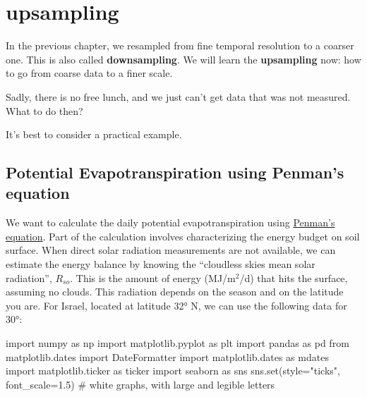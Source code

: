 \documentclass[
  letterpaper,
  DIV=11,
  numbers=noendperiod,
  oneside]{scrreprt}
\newenvironment{Shaded}{\begin{snugshade}}{\end{snugshade}}
\newcommand{\BuiltInTok}[1]{\textcolor[rgb]{0.00,0.23,0.31}{#1}}
\newcommand{\CommentTok}[1]{\textcolor[rgb]{0.37,0.37,0.37}{#1}}
\newcommand{\FloatTok}[1]{\textcolor[rgb]{0.68,0.00,0.00}{#1}}
\newcommand{\ImportTok}[1]{\textcolor[rgb]{0.00,0.46,0.62}{#1}}
\newcommand{\NormalTok}[1]{\textcolor[rgb]{0.00,0.23,0.31}{#1}}
\newcommand{\OperatorTok}[1]{\textcolor[rgb]{0.37,0.37,0.37}{#1}}
\newcommand{\StringTok}[1]{\textcolor[rgb]{0.13,0.47,0.30}{#1}}
\begin{document}
\hypertarget{upsampling}{%
\chapter{upsampling}\label{upsampling}}

In the previous chapter, we resampled from fine temporal resolution to a
coarser one. This is also called \textbf{downsampling}. We will learn
the \textbf{upsampling} now: how to go from coarse data to a finer
scale.

Sadly, there is no free lunch, and we just can't get data that was not
measured. What to do then?

It's best to consider a practical example.

\hypertarget{potential-evapotranspiration-using-penmans-equation}{%
\section{Potential Evapotranspiration using Penman's
equation}\label{potential-evapotranspiration-using-penmans-equation}}

We want to calculate the daily potential evapotranspiration using
\href{http://yairmau.com/surface-hydrology/evapotranspiration/evapotranspiration-lecture.html\#net-radiation}{Penman's
equation}. Part of the calculation involves characterizing the energy
budget on soil surface. When direct solar radiation measurements are not
available, we can estimate the energy balance by knowing the ``cloudless
skies mean solar radiation'', \(R_{so}\). This is the amount of energy
(MJ/m\(^2\)/d) that hits the surface, assuming no clouds. This radiation
depends on the season and on the latitude you are. For Israel, located
at latitude 32° N, we can use the following data for 30°:

\begin{Shaded}
\begin{Highlighting}[]
\ImportTok{import}\NormalTok{ numpy }\ImportTok{as}\NormalTok{ np}
\ImportTok{import}\NormalTok{ matplotlib.pyplot }\ImportTok{as}\NormalTok{ plt}
\ImportTok{import}\NormalTok{ pandas }\ImportTok{as}\NormalTok{ pd}
\ImportTok{from}\NormalTok{ matplotlib.dates }\ImportTok{import}\NormalTok{ DateFormatter}
\ImportTok{import}\NormalTok{ matplotlib.dates }\ImportTok{as}\NormalTok{ mdates}
\ImportTok{import}\NormalTok{ matplotlib.ticker }\ImportTok{as}\NormalTok{ ticker}
\ImportTok{import}\NormalTok{ seaborn }\ImportTok{as}\NormalTok{ sns}
\NormalTok{sns.}\BuiltInTok{set}\NormalTok{(style}\OperatorTok{=}\StringTok{"ticks"}\NormalTok{, font\_scale}\OperatorTok{=}\FloatTok{1.5}\NormalTok{)  }\CommentTok{\# white graphs, with large and legible letters}
\end{Highlighting}
\end{Shaded}
\end{document}
